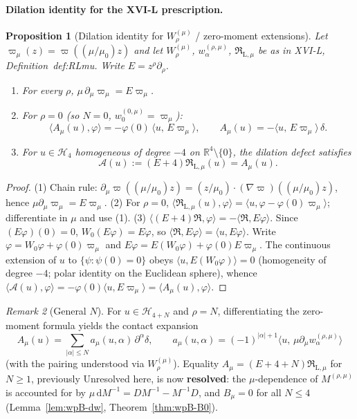 \documentclass{article}
\newtheorem{proposition}{Proposition}
\theoremstyle{remark}
\newtheorem{remark}[proposition]{Remark}
\begin{document}
\paragraph{Dilation identity for the XVI-L prescription.}
\begin{proposition}[Dilation identity for $W^{(\mu)}_\rho$ / zero-moment extensions]
\label{prop:M6-dil}
Let $\varpi_\mu(z)=\varpi((\mu/\mu_0)z)$ and let $W^{(\mu)}_\rho$, $w^{(\rho,\mu)}_\alpha$, $\mathfrak R_{\mathrm L,\mu}$ be as in XVI-L, Definition~def:RLmu.
Write $E=z^\rho\partial_\rho$.
\begin{enumerate}
\item For every $\rho$, $\mu\,\partial_\mu\varpi_\mu=E\varpi_\mu$.
\item For $\rho=0$ (so $N=0$, $w^{(0,\mu)}_0=\varpi_\mu$):
\[
\bigl\langle A_\mu(u),\varphi\bigr\rangle
=
-\varphi(0)\,\bigl\langle u,\,E\varpi_\mu\bigr\rangle,
\qquad
A_\mu(u)=-\bigl\langle u,\,E\varpi_\mu\bigr\rangle\,\delta.
\]
\item For $u\in\mathcal H_4$ homogeneous of degree $-4$ on $\mathbb R^4\setminus\{0\}$, the dilation defect satisfies
\[
\mathcal A(u):=(E+4)\mathfrak R_{\mathrm L,\mu}(u)=A_\mu(u).
\]
\end{enumerate}
\end{proposition}

\begin{proof}
(1) Chain rule: $\partial_\mu\varpi((\mu/\mu_0)z)=(z/\mu_0)\cdot(\nabla\varpi)((\mu/\mu_0)z)$, hence $\mu\partial_\mu\varpi_\mu=E\varpi_\mu$.
(2) For $\rho=0$, $\langle\mathfrak R_{\mathrm L,\mu}(u),\varphi\rangle=\langle u,\varphi-\varphi(0)\varpi_\mu\rangle$; differentiate in $\mu$ and use (1).
(3) $\langle(E+4)\mathfrak R,\varphi\rangle=-\langle\mathfrak R,E\varphi\rangle$.
Since $(E\varphi)(0)=0$, $W_0(E\varphi)=E\varphi$, so $\langle\mathfrak R,E\varphi\rangle=\langle u,E\varphi\rangle$.
Write $\varphi=W_0\varphi+\varphi(0)\varpi_\mu$ and $E\varphi=E(W_0\varphi)+\varphi(0)E\varpi_\mu$.
The continuous extension of $u$ to $\{\psi:\psi(0)=0\}$ obeys $\langle u,E(W_0\varphi)\rangle=0$ (homogeneity of degree $-4$; polar identity on the Euclidean sphere), whence $\langle\mathcal A(u),\varphi\rangle=-\varphi(0)\langle u,E\varpi_\mu\rangle=\langle A_\mu(u),\varphi\rangle$.
\end{proof}

\begin{remark}[General $N$]
\label{rem:M6-N}
For $u\in\mathcal H_{4+N}$ and $\rho=N$, differentiating the zero-moment formula yields the contact expansion
\[
A_\mu(u)=\sum_{|\alpha|\le N}a_\mu(u,\alpha)\,\partial^\alpha\delta,
\qquad
a_\mu(u,\alpha)=(-1)^{|\alpha|+1}\bigl\langle u,\,\mu\partial_\mu w^{(\rho,\mu)}_\alpha\bigr\rangle
\]
(with the pairing understood via $W^{(\mu)}_\rho$).
Equality $A_\mu=(E+4+N)\mathfrak R_{\mathrm L,\mu}$ for $N\ge1$, previously Unresolved here, is now \textbf{resolved}: the $\mu$-dependence of $M^{(\rho,\mu)}$ is accounted for by $\mu\,\mathrm dM^{-1}=DM^{-1}-M^{-1}D$, and $B_\mu=0$ for all $N\le4$ (Lemma~\ref{lem:wpB-dw}, Theorem~\ref{thm:wpB-B0}).
\end{remark}
\end{document}
